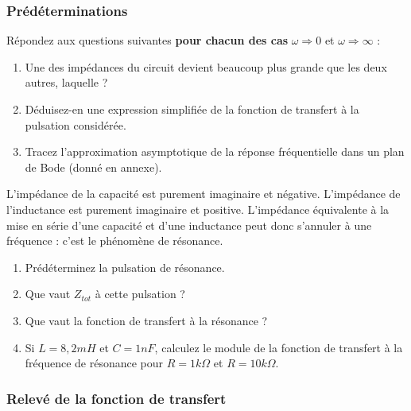 \documentclass{../template/tp}
\begin{document}
\subsubsection{Prédéterminations}

\begin{predet}
\Question
{
Répondez aux questions suivantes \textbf{pour chacun des cas} $\omega \Rightarrow 0$ et  $\omega \Rightarrow \infty$ :
\begin{enumerate}
\item Une des impédances du circuit devient beaucoup plus grande que les deux autres, laquelle ?
\item Déduisez-en une expression simplifiée de la fonction de transfert à la pulsation considérée.
\item Tracez l'approximation asymptotique de la réponse fréquentielle dans un plan de Bode (donné en annexe).
\end{enumerate}
}
{}

\Question
{
L'impédance de la capacité est purement imaginaire et négative. L'impédance de l'inductance est purement
imaginaire et positive.
L'impédance équivalente à la mise en série d'une capacité et d'une inductance peut donc s'annuler à une fréquence :
c'est le phénomène de résonance.
\begin{enumerate}
\item Prédéterminez la pulsation de résonance.
\item Que vaut $Z_{tot}$ à cette pulsation ?
\item Que vaut la fonction de transfert à la résonance ?
\item Si $L = 8,2mH$ et $C = 1nF$, calculez le module de la fonction de transfert à la fréquence de résonance pour $R = 1 k\Omega$ et $R = 10 k\Omega$.
\end{enumerate}
}
{}
\end{predet}

\subsubsection{Relevé de la fonction de transfert}
\end{document}
